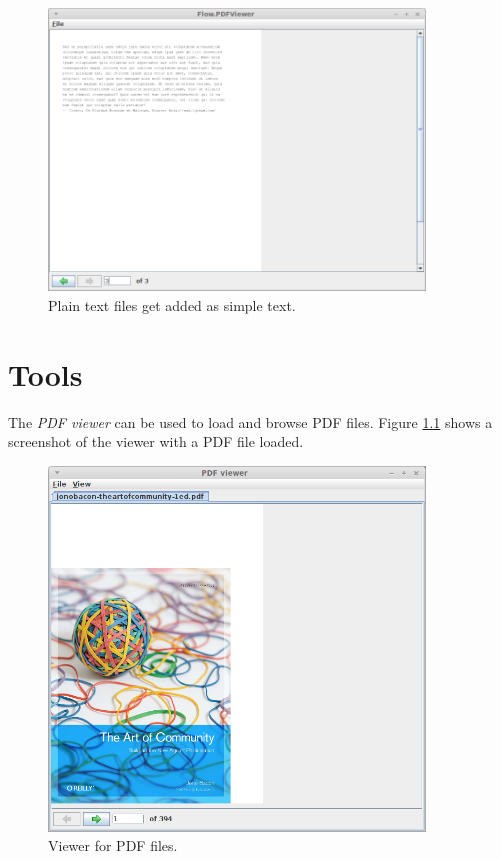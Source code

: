 \documentclass[a4paper]{book}
\begin{document}
\begin{figure}[htb]
  \centering
  \includegraphics[width=10.0cm]{images/pdf-create-output3.png}
  \caption{Plain text files get added as simple text.}
  \label{pdf-create-output3}
\end{figure}

\chapter{Tools}
The \textit{PDF viewer} can be used to load and browse PDF files. Figure 
\ref{pdf-viewer} shows a screenshot of the viewer with a PDF file loaded.

\begin{figure}[htb]
  \centering
  \includegraphics[width=10.0cm]{images/pdf-viewer.png}
  \caption{Viewer for PDF files.}
  \label{pdf-viewer}
\end{figure}
\end{document}
